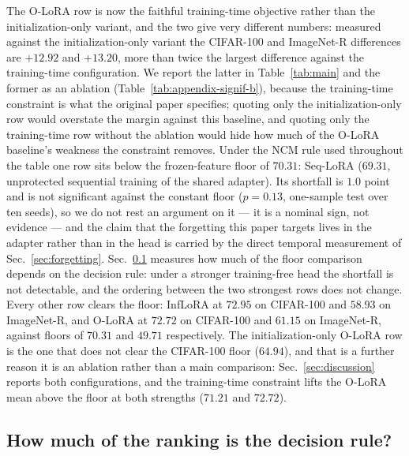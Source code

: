 The O-LoRA row is now the faithful training-time objective rather than the
initialization-only variant, and the two give very different numbers: measured against the
initialization-only variant the CIFAR-100 and ImageNet-R differences are $+12.92$ and
$+13.20$, more than twice the largest difference against the training-time configuration. We
report the latter in Table~\ref{tab:main} and the former as an ablation
(Table~\ref{tab:appendix-signif-b}), because the training-time constraint is what the original
paper specifies; quoting only the initialization-only row would overstate the margin against
this baseline, and quoting only the training-time row without the ablation would hide how much
of the O-LoRA baseline's weakness the constraint removes. Under the NCM rule used throughout
the table one row sits below the frozen-feature floor of $70.31$: Seq-LoRA ($69.31$,
unprotected sequential training of the shared adapter). Its shortfall is $1.0$ point and is
not significant against the constant floor ($p=0.13$, one-sample test over ten seeds), so we
do not rest an argument on it --- it is a nominal sign, not evidence --- and the claim that the
forgetting this paper targets lives in the adapter rather than in the head is carried by the
direct temporal measurement of Sec.~\ref{sec:forgetting}. Sec.~\ref{sec:posthoc} measures how
much of the floor comparison depends on the decision rule: under a stronger training-free head
the shortfall is not detectable, and the ordering between the two strongest rows does not
change. Every other row clears the floor: InfLoRA at $72.95$ on CIFAR-100 and $58.93$ on
ImageNet-R, and O-LoRA at $72.72$ on CIFAR-100 and $61.15$ on ImageNet-R, against floors of
$70.31$ and $49.71$ respectively. The initialization-only O-LoRA row is the one that does not
clear the CIFAR-100 floor ($64.94$), and that is a further reason it is an ablation rather
than a main comparison: Sec.~\ref{sec:discussion} reports both configurations, and the
training-time constraint lifts the O-LoRA mean above the floor at both strengths ($71.21$ and
$72.72$).

\subsection{How much of the ranking is the decision rule?}
\label{sec:posthoc}


